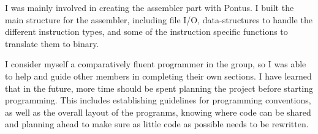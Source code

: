 I was mainly involved in creating the assembler part with Pontus. I built the main structure for the assembler, including file I/O, data-structures to handle the different instruction types, and some of the instruction specific functions to translate them to binary. 

I consider myself a comparatively fluent programmer in the group, so I was able to help and guide other members in completing their own sections. I have learned that in the future, more time should be spent planning the project before starting programming. This includes establishing guidelines for programming conventions, as well as the overall layout of the progranms, knowing where code can be shared and planning ahead to make sure as little code as possible needs to be rewritten.
